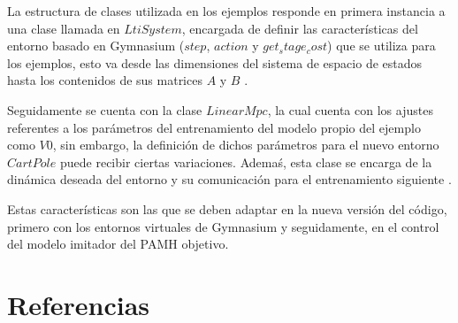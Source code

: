 \documentclass[12pt]{article}
\begin{document}
La estructura de clases utilizada en los ejemplos responde en primera instancia a una clase llamada en $LtiSystem$, encargada de definir las características del entorno basado en Gymnasium ($step$, $action$ y $get_stage_cost$) que se utiliza para los ejemplos, esto va desde las dimensiones del sistema de espacio de estados hasta los contenidos de sus matrices $A$ y $B$ \cite{Airdaldi2023}.

Seguidamente se cuenta con la clase $LinearMpc$, la cual cuenta con los ajustes referentes a los parámetros del entrenamiento del modelo propio del ejemplo como $V0$, sin embargo, la definición de dichos parámetros para el nuevo entorno $CartPole$ puede recibir ciertas variaciones. Ademaś, esta clase se encarga de la dinámica deseada del entorno y su comunicación para el entrenamiento siguiente \cite{Airdaldi2023}.

Estas características son las que se deben adaptar en la nueva versión del código, primero con los entornos virtuales de Gymnasium y seguidamente, en el control del modelo imitador del PAMH objetivo.





\newpage

\section*{Referencias}
\renewcommand\refname{}


\end{document}
